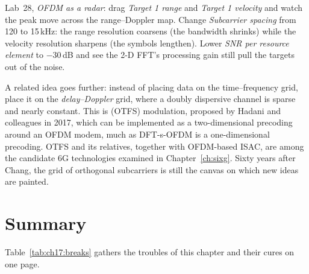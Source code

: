 \begin{tryit}
Lab~28, \emph{OFDM as a radar}: drag \emph{Target 1 range} and \emph{Target 1 velocity} and watch the
peak move across the range--Doppler map. Change \emph{Subcarrier spacing} from 120 to 15\,kHz: the
range resolution coarsens (the bandwidth shrinks) while the velocity resolution sharpens (the
symbols lengthen). Lower \emph{SNR per resource element} to $-30$\,dB and see the 2-D FFT's processing
gain still pull the targets out of the noise.
\end{tryit}

A related idea goes further: instead of placing data on the time--frequency grid, place it on the
\emph{delay--Doppler} grid, where a doubly dispersive channel is sparse and nearly constant. This is
 (OTFS) modulation, proposed by Hadani and colleagues in 2017, which
can be implemented as a two-dimensional precoding around an OFDM modem, much as DFT-s-OFDM is a one-dimensional
precoding. OTFS and its relatives, together with OFDM-based ISAC, are among the candidate 6G technologies examined
in Chapter~\ref{ch:sixg}. Sixty years after Chang, the grid of orthogonal subcarriers is still the canvas on
which new ideas are painted.

\section{Summary}
\label{sec:ch17:summary}

Table~\ref{tab:ch17:breaks} gathers the troubles of this chapter and their cures on one page.

